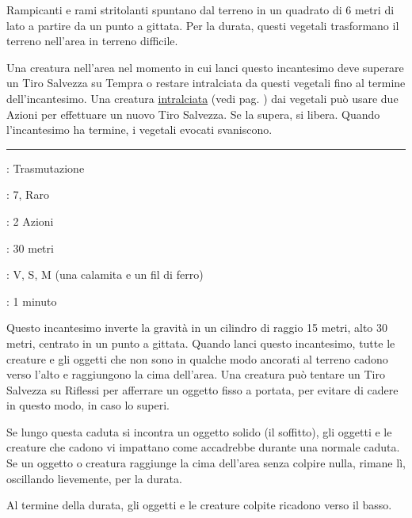 \begin{multicols}{2}
Rampicanti e rami stritolanti spuntano dal terreno in un quadrato di 6 metri di lato a partire da un punto a gittata. Per la durata, questi vegetali trasformano il terreno nell'area in terreno difficile.

Una creatura nell'area nel momento in cui lanci questo incantesimo deve superare un Tiro Salvezza su Tempra o restare intralciata da questi vegetali fino al termine dell'incantesimo. Una creatura \hyperlink{intralciato}{intralciata} (vedi pag. \pageref{intralciato}) dai vegetali può usare due Azioni per effettuare un nuovo Tiro Salvezza. Se la supera, si libera. Quando l'incantesimo ha termine, i vegetali evocati svaniscono.

\smallskip\noindent\rule{\linewidth}{2pt} \hypertarget{Inversione della Gravità}{}\medskip{}
\noindent
\begin{description}[noitemsep, topsep=0pt, parsep=0pt, partopsep=0pt, leftmargin=0cm, labelwidth=2.8cm]
	\item[\textbf{Lista di Magia}]: Trasmutazione
	\item[\textbf{Livello}]: 7, Raro
	\item[\textbf{T. di Lancio}]: 2 Azioni
	\item[\textbf{Gittata}]: 30 metri
	\item[\textbf{Componenti}]: V, S, M (una calamita e un fil di ferro)
	\item[\textbf{Durata}]: 1 minuto
\end{description}

Questo incantesimo inverte la gravità in un cilindro di raggio 15 metri, alto 30 metri, centrato in un punto a gittata. Quando lanci questo incantesimo, tutte le creature e gli oggetti che non sono in qualche modo ancorati al terreno cadono verso l'alto e raggiungono la cima dell'area. Una creatura può tentare un Tiro Salvezza su Riflessi per afferrare un oggetto fisso a portata, per evitare di cadere in questo modo, in caso lo superi.

Se lungo questa caduta si incontra un oggetto solido (il soffitto), gli oggetti e le creature che cadono vi impattano come accadrebbe durante una normale caduta. Se un oggetto o creatura raggiunge la cima dell'area senza colpire nulla, rimane lì, oscillando lievemente, per la durata.

Al termine della durata, gli oggetti e le creature colpite ricadono verso il basso.


\end{multicols}

